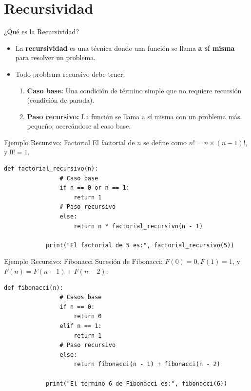 \documentclass[aspectratio=169, 11pt]{beamer}
\begin{document}
	\section{Recursividad}
	
	\begin{frame}{¿Qué es la Recursividad?}
		\begin{itemize}
			\item La \textbf{recursividad} es una técnica donde una función se llama \textbf{a sí misma} para resolver un problema.
			\item Todo problema recursivo debe tener:
			\begin{enumerate}
				\item \textbf{Caso base:} Una condición de término simple que no requiere recursión (condición de parada).
				\item \textbf{Paso recursivo:} La función se llama a sí misma con un problema más pequeño, acercándose al caso base.
			\end{enumerate}
		\end{itemize}
	\end{frame}
	
	\begin{frame}[fragile]{Ejemplo Recursivo: Factorial}
		El factorial de $n$ se define como $n! = n \times (n-1)!$, y $0! = 1$.
		
		\begin{lstlisting}[gobble=3]
			def factorial_recursivo(n):
				# Caso base
				if n == 0 or n == 1:
					return 1
				# Paso recursivo
				else:
					return n * factorial_recursivo(n - 1)
					
			print("El factorial de 5 es:", factorial_recursivo(5))
		\end{lstlisting}
	\end{frame}
	
	\begin{frame}[fragile]{Ejemplo Recursivo: Fibonacci}
		Sucesión de Fibonacci: $F(0)=0, F(1)=1$, y $F(n) = F(n-1) + F(n-2)$.
		
		\begin{lstlisting}[gobble=3]
			def fibonacci(n):
				# Casos base
				if n == 0:
					return 0
				elif n == 1:
					return 1
				# Paso recursivo
				else:
					return fibonacci(n - 1) + fibonacci(n - 2)
					
			print("El término 6 de Fibonacci es:", fibonacci(6))
		\end{lstlisting}
	\end{frame}
	
\end{document}
